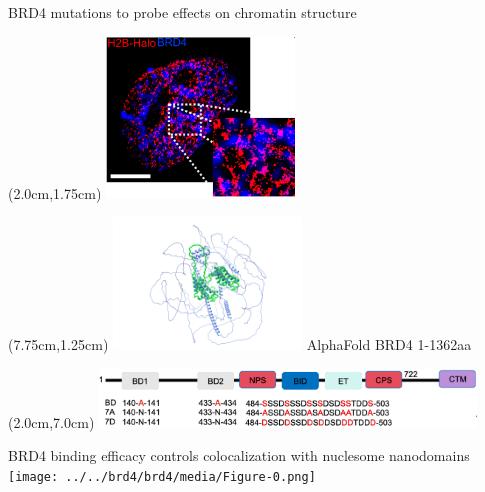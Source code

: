 \documentclass{beamer}					%
\begin{document}
\begin{frame}{BRD4 mutations to probe effects on chromatin structure}

\begin{textblock*}{5cm}(2.0cm,1.75cm)
\includegraphics[width=5cm]{../../dissertation/dissertation/media/TwoColor}
\end{textblock*}

\begin{textblock*}{5cm}(7.75cm,1.25cm)
\includegraphics[width=5cm]{../../brd4/brd4/media/AlphaFoldStructure}
\;\; AlphaFold BRD4 1-1362aa 
\end{textblock*}

\begin{textblock*}{10cm}(2.0cm,7.0cm)
\includegraphics[width=10cm]{../../brd4/brd4/media/Mutations}
\end{textblock*}

\end{frame}

\begin{frame}{BRD4 binding efficacy controls colocalization with nuclesome nanodomains}
\texttt{[image: ../../brd4/brd4/media/Figure-0.png]}
\end{frame}
\end{document}
